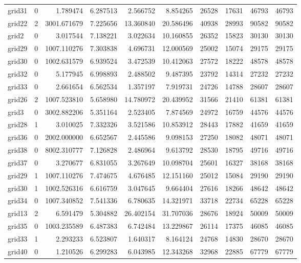 \begin{longtable}{|l|r|r|r|r|r|r|r|r|r|}
grid31 & 0 & 1.789474 & 6.287513 & 2.566752 & 8.854265 & 26528 & 17631 & 46793 & 46793 \\
grid22 & 2 & 3001.671679 & 7.225656 & 13.360840 & 20.586496 & 40938 & 28993 & 90582 & 90582 \\
grid2 & 0 & 3.017544 & 7.138221 & 3.022634 & 10.160855 & 26352 & 15823 & 30130 & 30130 \\
grid29 & 0 & 1007.110276 & 7.303838 & 4.696731 & 12.000569 & 25002 & 15074 & 29175 & 29175 \\
grid30 & 0 & 1002.631579 & 6.939524 & 3.472539 & 10.412063 & 27572 & 18222 & 48578 & 48578 \\
grid32 & 0 & 5.177945 & 6.998893 & 2.488502 & 9.487395 & 23792 & 14314 & 27232 & 27232 \\
grid33 & 0 & 2.661654 & 6.562534 & 1.357197 & 7.919731 & 24726 & 14788 & 28607 & 28607 \\
grid26 & 2 & 1007.523810 & 5.658980 & 14.780972 & 20.439952 & 31566 & 21410 & 61381 & 61381 \\
grid3 & 0 & 3002.882206 & 5.351164 & 2.523405 & 7.874569 & 24972 & 16759 & 44576 & 44576 \\
grid28 & 1 & 3.010025 & 7.332326 & 3.521586 & 10.853912 & 28443 & 17882 & 41659 & 41659 \\
grid36 & 0 & 2002.000000 & 6.652567 & 2.445586 & 9.098153 & 27250 & 18082 & 48071 & 48071 \\
grid38 & 0 & 8002.310777 & 7.126828 & 2.486964 & 9.613792 & 28530 & 18795 & 49716 & 49716 \\
grid37 & 0 & 3.270677 & 6.831055 & 3.267649 & 10.098704 & 25601 & 16327 & 38168 & 38168 \\
grid29 & 1 & 1007.110276 & 7.474675 & 4.676485 & 12.151160 & 25012 & 15084 & 29190 & 29190 \\
grid30 & 1 & 1002.526316 & 6.616759 & 3.047645 & 9.664404 & 27616 & 18266 & 48642 & 48642 \\
grid34 & 0 & 1007.340852 & 7.541336 & 6.780635 & 14.321971 & 33718 & 22734 & 65228 & 65228 \\
grid13 & 2 & 6.591479 & 5.304882 & 26.402154 & 31.707036 & 28676 & 18924 & 50009 & 50009 \\
grid35 & 0 & 1003.235589 & 6.487383 & 6.742484 & 13.229867 & 26114 & 17375 & 46085 & 46085 \\
grid33 & 1 & 2.293233 & 6.523807 & 1.640317 & 8.164124 & 24768 & 14830 & 28670 & 28670 \\
grid40 & 0 & 1.210526 & 6.299283 & 6.043985 & 12.343268 & 32968 & 22885 & 67779 & 67779 \\

\end{longtable}
